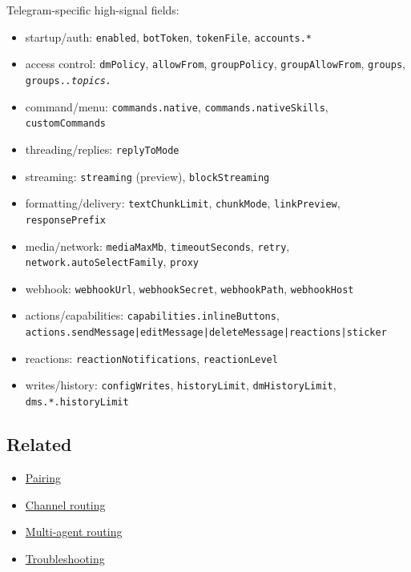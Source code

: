 Telegram-specific high-signal fields:

\begin{itemize}
  \item startup/auth: \texttt{enabled}, \texttt{botToken}, \texttt{tokenFile}, \texttt{accounts.*}
  \item access control: \texttt{dmPolicy}, \texttt{allowFrom}, \texttt{groupPolicy}, \texttt{groupAllowFrom}, \texttt{groups}, \texttt{groups.\textit{.topics.}}
  \item command/menu: \texttt{commands.native}, \texttt{commands.nativeSkills}, \texttt{customCommands}
  \item threading/replies: \texttt{replyToMode}
  \item streaming: \texttt{streaming} (preview), \texttt{blockStreaming}
  \item formatting/delivery: \texttt{textChunkLimit}, \texttt{chunkMode}, \texttt{linkPreview}, \texttt{responsePrefix}
  \item media/network: \texttt{mediaMaxMb}, \texttt{timeoutSeconds}, \texttt{retry}, \texttt{network.autoSelectFamily}, \texttt{proxy}
  \item webhook: \texttt{webhookUrl}, \texttt{webhookSecret}, \texttt{webhookPath}, \texttt{webhookHost}
  \item actions/capabilities: \texttt{capabilities.inlineButtons}, \texttt{actions.sendMessage|editMessage|deleteMessage|reactions|sticker}
  \item reactions: \texttt{reactionNotifications}, \texttt{reactionLevel}
  \item writes/history: \texttt{configWrites}, \texttt{historyLimit}, \texttt{dmHistoryLimit}, \texttt{dms.*.historyLimit}
\end{itemize}


\subsection{Related}


\begin{itemize}
  \item \href{/channels/pairing}{Pairing}
  \item \href{/channels/channel-routing}{Channel routing}
  \item \href{/concepts/multi-agent}{Multi-agent routing}
  \item \href{/channels/troubleshooting}{Troubleshooting}
\end{itemize}



